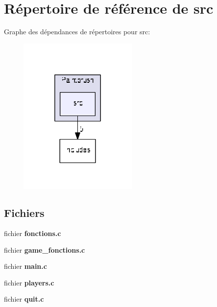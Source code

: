 \section{Répertoire de référence de src}
\label{dir_cbcf9621b2f7723eacd11feeec809137}
Graphe des dépendances de répertoires pour src\+:
\nopagebreak
\begin{figure}[H]
\begin{center}
\leavevmode
\includegraphics[width=166pt]{dir_cbcf9621b2f7723eacd11feeec809137_dep}
\end{center}
\end{figure}
\subsection*{Fichiers}
\begin{DoxyCompactItemize}
\item 
fichier \textbf{ fonctions.\+c}
\item 
fichier \textbf{ game\+\_\+fonctions.\+c}
\item 
fichier \textbf{ main.\+c}
\item 
fichier \textbf{ players.\+c}
\item 
fichier \textbf{ quit.\+c}
\end{DoxyCompactItemize}
